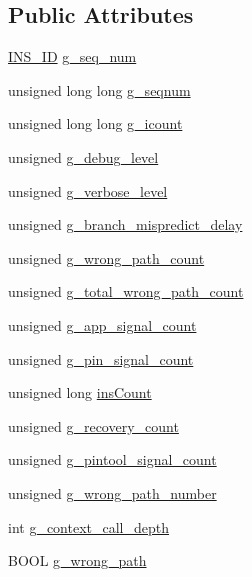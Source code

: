 \subsection*{Public Attributes}
\begin{DoxyCompactItemize}
\item 
\hyperlink{global_2global_8h_a1883c47d0023d0f200e1d86eced6a070}{INS\_\-ID} \hyperlink{structg__variable_a619e353ba382aa0b346af08d3dc0729b}{g\_\-seq\_\-num}
\item 
unsigned long long \hyperlink{structg__variable_a8ab71de244f2279885143ea11f7e7a5c}{g\_\-seqnum}
\item 
unsigned long long \hyperlink{structg__variable_a9ab79f56074bb46d6ae7d797c52442f3}{g\_\-icount}
\item 
unsigned \hyperlink{structg__variable_a3359a225f5a683c6ef05eed7ac5a8490}{g\_\-debug\_\-level}
\item 
unsigned \hyperlink{structg__variable_ac965e96976bbbeb71833c68438b5fc47}{g\_\-verbose\_\-level}
\item 
unsigned \hyperlink{structg__variable_aa7d9d96654c800965904eab03e9fde48}{g\_\-branch\_\-mispredict\_\-delay}
\item 
unsigned \hyperlink{structg__variable_a56cbb365fc7e39e093326334864e243a}{g\_\-wrong\_\-path\_\-count}
\item 
unsigned \hyperlink{structg__variable_a155baf9caa1600f209b109f6eebf50eb}{g\_\-total\_\-wrong\_\-path\_\-count}
\item 
unsigned \hyperlink{structg__variable_a8065e226bc2987122b831ffc1d58052a}{g\_\-app\_\-signal\_\-count}
\item 
unsigned \hyperlink{structg__variable_a248d8225c555d7573d3c830af054e13e}{g\_\-pin\_\-signal\_\-count}
\item 
unsigned long \hyperlink{structg__variable_a4740d9b4ca63320866b2eda4bba01b86}{insCount}
\item 
unsigned \hyperlink{structg__variable_a4e19c0e3b77b96a6130c215059fa7d53}{g\_\-recovery\_\-count}
\item 
unsigned \hyperlink{structg__variable_ac3a9cb982af4deac7d5d6183df424560}{g\_\-pintool\_\-signal\_\-count}
\item 
unsigned \hyperlink{structg__variable_adcc07b62ed94dbd9dc61ad8ca8b366a1}{g\_\-wrong\_\-path\_\-number}
\item 
int \hyperlink{structg__variable_ac18a5c9f33e0c2731c83204eba76be37}{g\_\-context\_\-call\_\-depth}
\item 
BOOL \hyperlink{structg__variable_aeeef678f78f34f8743dc14c035ef56dd}{g\_\-wrong\_\-path}

\end{DoxyCompactItemize}
